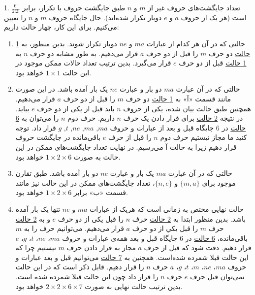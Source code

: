   
    1. 
    \p
    تعداد جایگشت‌های حروف غیر از $m$ و $n$ طبق جایگشت حروف با تکرار، برابر $\frac{6!}{2!2!}$ است
    (هر یک از حروف $a$ و $e$ دوبار تکرار شده‌اند).
    حال جایگاه حروف $m$ و $n$ را تعیین می‌کنیم.
    برای این کار، چهار حالت داریم:
    \begin{enumerate}
      \item 
      حالتی که در آن هر کدام از عبارات $ma$ و $ne$
      دوبار تکرار شوند. بدین منظور، به
      \underline{1 حالت} 
       دو حرف 
      $m$ 
      را قبل از دو حرف 
      $a$
      قرار می‌دهیم.
      به طور مشابه دو حرف
       $n$ 
     به
     \underline{1 حالت}
       قبل از دو حرف 
       $e$
       قرار می‌گیرد.
      بدین ترتیب تعداد حالات ممکن موجود در این حالت 
      $1\times1$
      خواهد بود.
      
      \item
      حالتی که در آن عبارت $ma$ دو بار و عبارت $ne$ 
      یک بار آمده باشد. در این صورت مانند قسمت «آ» به
      \underline{1 حالت}  
       دو حرف 
      $m$
      را قبل از دو حرف 
      $a$
      قرار می‌دهیم.
      همچنین طبق حالت بیان شده، یکی از حروف 
      $n$ باید قبل از یکی از دو حرف $e$
      بیاید. در نتیجه
      \underline{2 حالت}
      برای قرار دادن یک حرف $n$ داریم. 
       حرف دوم 
      $n$
      را می‌توان به 
      \underline{6 حالت}
       در 6 جایگاه قبل و بعد از عبارات و حروف
      $ma$, 
      $ma$, 
      $ne$, 
      $t$,   
      $g$
      قرار داد.
      توجه کنید ما مجاز نیستیم حرف دوم
      $n$
      را قبل از حرف $e$
      باقی‌مانده در جایگشت حروف قرار دهیم زیرا به حالت آ می‌رسیم.
     در نهایت تعداد جایگشت‌های ممکن در این حالت به صورت 
      $1\times 2\times 6$
      خواهد بود.

      \item
      حالتی که در آن عبارت $ma$ یک بار و عبارت $ne$
    دو بار آمده باشد.
      طبق تقارن موجود براي 
      $\{m,a\}$ و
      $\{n,e\}$، 
    تعداد جایگشت‌های ممکن در این حالت نیز مانند قسمت «ب» برابر 
    $1\times 2\times 6$ 
      خواهد بود.
      
      \item
      حالت نهایی مختص به زمانی است که هریک از عبارات $ma$ و $ne$ تنها یک بار آمده باشد.
      بدین منظور ابتدا به
      \underline{2 حالت}
      حرف 
      $n$
      را قبل یکی از دو حرف 
      $e$
      و به
      \underline{2 حالت}  
      حرف  
      $m$
      را قبل يكي از دو حرف 
      $a$ 
      قرار می‌دهیم.
      می‌توانیم حرف
       را به $m$ باقی‌مانده،
      \underline{6 حالت} 
       در 6 جایگاه
      قبل و بعد همه‌ی عبارات و حروف 
      $ma$، $ne$، $t$، $g$، $e$
       قرار دهیم.
      دقت شود که قبل از حرف $a$ مجاز به قرار دادن حرف $m$ نیستیم چرا که این حالت قبلا شمرده شده‌است.
      همچنین به 
      \underline{7 حالت}
      می‌توانیم قبل و بعد عبارات و حروف
      $ma$،
      $ne$،
      $m$،
      $t$، $g$، $a$
      حرف $n$ را قرار دهیم.
      قابل ذکر است که در این حالت نمی‌توان قبل حرف $e$
      حرف $n$ را قرار داد چون این حالت قبلا شمرده شده است.
      بدین ترتیب حالت نهایی به صورت 
      $2\times 2 \times 6 \times 7$
      خواهد بود.
    \end{enumerate}
